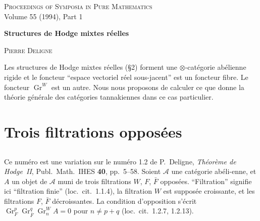 \documentclass[12pt,a4paper]{article}
\theoremstyle{plain}
\theoremstyle{definition}
\DeclareMathOperator{\Gr}{Gr}
\newcommand{\A}{\mathcal{A}}
\begin{document}
\begin{center}
\small\textsc{Proceedings of Symposia in Pure Mathematics}\\
\small Volume 55 (1994), Part 1
\end{center}

\vspace{1cm}

\begin{center}
\Large\textbf{Structures de Hodge mixtes r\'{e}elles}
\end{center}

\begin{flushright}
\textsc{Pierre Deligne}
\end{flushright}

\vspace{0.5cm}

Les structures de Hodge mixtes r\'{e}elles (\S2) forment une $\otimes$-cat\'{e}gorie ab\'{e}lienne
rigide et le foncteur ``espace vectoriel r\'{e}el sous-jacent'' est un foncteur
fibre. Le foncteur $\Gr^W$ est un autre. Nous nous proposons de calculer ce que
donne la th\'{e}orie g\'{e}n\'{e}rale des cat\'{e}gories tannakiennes dans ce cas particulier.

\section{Trois filtrations oppos\'{e}es}

\subsection{}

Ce num\'{e}ro est une variation sur le num\'{e}ro 1.2 de P.~Deligne, \textit{Th\'{e}or\`{e}me
de Hodge~II}, Publ.~Math.~IHES \textbf{40}, pp.~5--58. Soient $\A$ une cat\'{e}gorie ab\'{e}li-\-enne,
et $A$ un objet de $\A$ muni de trois filtrations $W$, $F$, $\bar{F}$ oppos\'{e}es.
``Filtration'' signifie ici ``filtration finie'' (loc.~cit.~1.1.4), la filtration $W$ est
suppos\'{e}e croissante, et les filtrations $F$, $\bar{F}$ d\'{e}croissantes. La condition
d'opposition s'\'{e}crit $\Gr_F^p \Gr_{\bar{F}}^q \Gr_n^W A = 0$ pour $n \neq p+q$
(loc.~cit.~1.2.7, 1.2.13).
\end{document}
